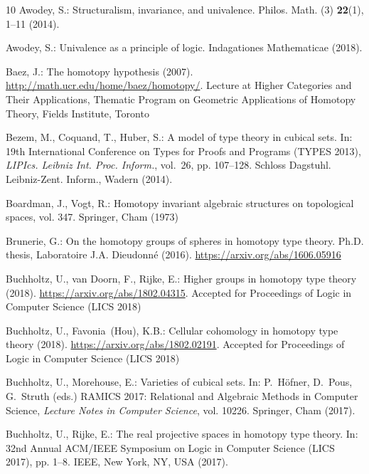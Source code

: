 \documentclass[12pt]{article}
\begin{document}
\begin{thebibliography}{10}
Awodey, S.: Structuralism, invariance, and univalence.
\newblock Philos. Math. (3) \textbf{22}(1), 1--11 (2014).
\newblock {}

Awodey, S.: Univalence as a principle of logic.
\newblock Indagationes Mathematicae  (2018).
\newblock {}

Baez, J.: The homotopy hypothesis (2007).
\newblock \urlprefix\url{http://math.ucr.edu/home/baez/homotopy/}.
\newblock Lecture at Higher Categories and Their Applications, Thematic Program
  on Geometric Applications of Homotopy Theory, Fields Institute, Toronto

Bezem, M., Coquand, T., Huber, S.: A model of type theory in cubical sets.
\newblock In: 19th {I}nternational {C}onference on {T}ypes for {P}roofs and
  {P}rograms (TYPES 2013), \emph{LIPIcs. Leibniz Int. Proc. Inform.}, vol.~26,
  pp. 107--128. Schloss Dagstuhl. Leibniz-Zent. Inform., Wadern (2014).
\newblock {}

Boardman, J., Vogt, R.: Homotopy invariant algebraic structures on topological
  spaces, vol. 347.
\newblock Springer, Cham (1973)

Brunerie, G.: On the homotopy groups of spheres in homotopy type theory.
\newblock Ph.D. thesis, Laboratoire J.A. Dieudonn{\'e} (2016).
\newblock \urlprefix\url{https://arxiv.org/abs/1606.05916}

Buchholtz, U., van Doorn, F., Rijke, E.: Higher groups in homotopy type theory
  (2018).
\newblock \urlprefix\url{https://arxiv.org/abs/1802.04315}.
\newblock Accepted for Proceedings of Logic in Computer Science (LICS 2018)

Buchholtz, U., Favonia~(Hou), K.B.: Cellular cohomology in homotopy type theory
  (2018).
\newblock \urlprefix\url{https://arxiv.org/abs/1802.02191}.
\newblock Accepted for Proceedings of Logic in Computer Science (LICS 2018)

Buchholtz, U., Morehouse, E.: Varieties of cubical sets.
\newblock In: P.~Höfner, D.~Pous, G.~Struth (eds.) RAMICS 2017: Relational and
  Algebraic Methods in Computer Science, \emph{Lecture Notes in Computer
  Science}, vol. 10226. Springer, Cham (2017).
\newblock {}

Buchholtz, U., Rijke, E.: The real projective spaces in homotopy type theory.
\newblock In: 32nd Annual ACM/IEEE Symposium on Logic in Computer Science (LICS
  2017), pp. 1--8. IEEE, New York, NY, USA (2017).
\newblock {}


\end{thebibliography}
\end{document}
